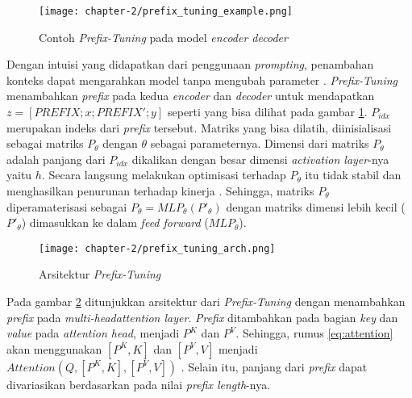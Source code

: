 \begin{figure}[h]
    \vspace{0.25cm}
    \centering
    \texttt{[image: chapter-2/prefix\_tuning\_example.png]}
    \caption{Contoh \textit{Prefix-Tuning} pada model \textit{encoder decoder} \parencite{prefix_tuning}}
    \label{fig:prefix_tuning_example}
\end{figure}

Dengan intuisi yang didapatkan dari penggunaan \textit{prompting}, penambahan konteks dapat mengarahkan model tanpa mengubah parameter \parencite{prefix_tuning}. \textit{Prefix-Tuning} menambahkan \textit{prefix} pada kedua \textit{encoder} dan \textit{decoder} untuk mendapatkan $z = [PREFIX;x;PREFIX';y]$ seperti yang bisa dilihat pada gambar \ref{fig:prefix_tuning_example}. $P_{idx}$ merupakan indeks dari \textit{prefix} tersebut. Matriks yang bisa dilatih, diinisialisasi sebagai matriks $P_\theta$ dengan $\theta$ sebagai parameternya. Dimensi dari matriks $P_\theta$ adalah panjang dari $P_{idx}$ dikalikan dengan besar dimensi \textit{activation layer}-nya yaitu $h$. Secara langsung melakukan optimisasi terhadap $P_\theta$ itu tidak stabil dan menghasilkan penurunan terhadap kinerja \parencite{prefix_tuning}. Sehingga, matriks $P_\theta$ diperamaterisasi sebagai $P_\theta = MLP_\theta(P'_\theta)$ dengan matriks dimensi lebih kecil ($P'_\theta$) dimasukkan ke dalam \textit{feed forward} ($MLP_\theta$).

\begin{figure}[h]
    \vspace{0.25cm}
    \centering
    \texttt{[image: chapter-2/prefix\_tuning\_arch.png]}
    \caption{Arsitektur \textit{Prefix-Tuning} \parencite{prefix_tuning}}
    \label{fig:prefix_tuning_arch}
\end{figure}

Pada gambar \ref{fig:prefix_tuning_arch} ditunjukkan arsitektur dari \textit{Prefix-Tuning} dengan menambahkan \textit{prefix} pada \textit{multi-headattention layer}. \textit{Prefix} ditambahkan pada bagian \textit{key} dan \textit{value} pada \textit{attention head}, menjadi $P^K$ dan $P^V$. Sehingga, rumus \ref{eq:attention} akan menggunakan $[P^K, K]$ dan $[P^V, V]$ menjadi $Attention(Q, [P^K, K], [P^V, V])$ \parencite{adapterhub}. Selain itu, panjang dari \textit{prefix} dapat divariasikan berdasarkan pada nilai \textit{prefix length}-nya.

